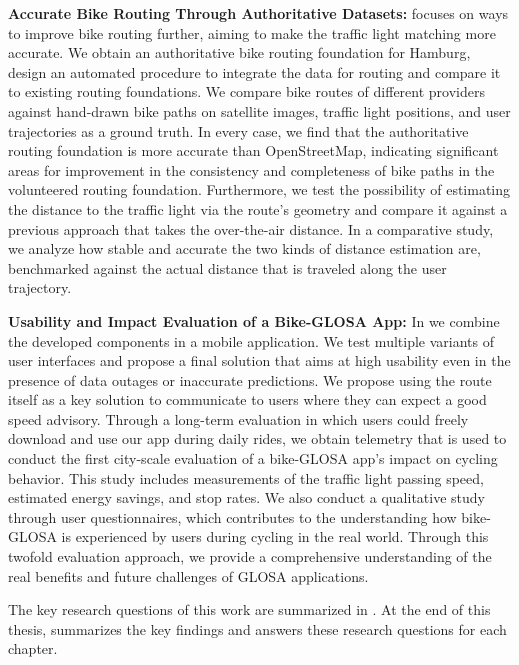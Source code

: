 \textbf{\color{cidarkblue}Accurate Bike Routing Through Authoritative Datasets:}  focuses on ways to improve bike routing further, aiming to make the traffic light matching more accurate. We obtain an authoritative bike routing foundation for Hamburg, design an automated procedure to integrate the data for routing and compare it to existing routing foundations. We compare bike routes of different providers against hand-drawn bike paths on satellite images, traffic light positions, and user trajectories as a ground truth. In every case, we find that the authoritative routing foundation is more accurate than OpenStreetMap, indicating significant areas for improvement in the consistency and completeness of bike paths in the volunteered routing foundation. Furthermore, we test the possibility of estimating the distance to the traffic light via the route's geometry and compare it against a previous approach that takes the over-the-air distance. In a comparative study, we analyze how stable and accurate the two kinds of distance estimation are, benchmarked against the actual distance that is traveled along the user trajectory.

\textbf{\color{cidarkblue}Usability and Impact Evaluation of a Bike-GLOSA App:} In  we combine the developed components in a mobile application. We test multiple variants of user interfaces and propose a final solution that aims at high usability even in the presence of data outages or inaccurate predictions. We propose using the route itself as a key solution to communicate to users where they can expect a good speed advisory. Through a long-term evaluation in which users could freely download and use our app during daily rides, we obtain telemetry that is used to conduct the first city-scale evaluation of a bike-GLOSA app's impact on cycling behavior. This study includes measurements of the traffic light passing speed, estimated energy savings, and stop rates. We also conduct a qualitative study through user questionnaires, which contributes to the understanding how bike-GLOSA is experienced by users during cycling in the real world. Through this twofold evaluation approach, we provide a comprehensive understanding of the real benefits and future challenges of GLOSA applications.

The key research questions of this work are summarized in . At the end of this thesis,  summarizes the key findings and answers these research questions for each chapter.





